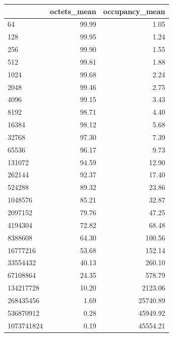 \begin{tabular}{lrr}
\toprule
 & octets_mean & occupancy_mean \\
\midrule
64 & 99.99 & 1.05 \\
128 & 99.95 & 1.24 \\
256 & 99.90 & 1.55 \\
512 & 99.81 & 1.88 \\
1024 & 99.68 & 2.24 \\
2048 & 99.46 & 2.75 \\
4096 & 99.15 & 3.43 \\
8192 & 98.71 & 4.40 \\
16384 & 98.12 & 5.68 \\
32768 & 97.30 & 7.39 \\
65536 & 96.17 & 9.73 \\
131072 & 94.59 & 12.90 \\
262144 & 92.37 & 17.40 \\
524288 & 89.32 & 23.86 \\
1048576 & 85.21 & 32.87 \\
2097152 & 79.76 & 47.25 \\
4194304 & 72.82 & 68.48 \\
8388608 & 64.30 & 100.56 \\
16777216 & 53.68 & 152.14 \\
33554432 & 40.13 & 260.10 \\
67108864 & 24.35 & 578.79 \\
134217728 & 10.20 & 2123.06 \\
268435456 & 1.69 & 25740.89 \\
536870912 & 0.28 & 45949.92 \\
1073741824 & 0.19 & 45554.21 \\
\bottomrule
\end{tabular}

